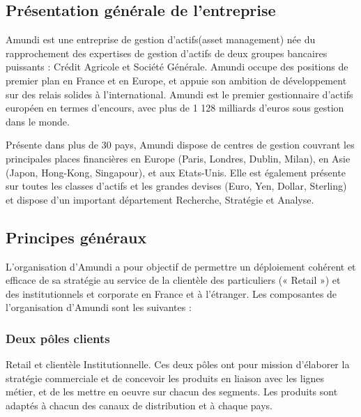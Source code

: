 \documentclass[12pt,a4paper]{report}
\begin{document}
\subsection{Présentation générale de l'entreprise}
Amundi est une entreprise de gestion d'actifs(asset management) née du rapprochement des expertises de gestion d'actifs de deux groupes bancaires puissants : Crédit Agricole et Société Générale. Amundi occupe des positions de premier plan en France et en Europe, et appuie son ambition de développement sur des relais solides à l'international.
Amundi est le premier gestionnaire d’actifs européen en termes d’encours, avec plus de 1 128 milliards d’euros sous gestion dans le monde.\vspace{0.6cm}

Présente dans plus de 30 pays, Amundi dispose de centres de gestion couvrant les principales places financières en Europe (Paris, Londres, Dublin, Milan), en Asie (Japon, Hong-Kong, Singapour), et aux Etats-Unis. Elle est également présente sur toutes les classes d’actifs et les grandes devises (Euro, Yen, Dollar, Sterling) et dispose d’un important département Recherche, Stratégie et Analyse.
\subsection{Principes généraux}
L’organisation d’Amundi a pour objectif de permettre un déploiement cohérent et efficace de sa stratégie au service de la clientèle des particuliers (« Retail ») et des institutionnels et corporate en France et à l’étranger.
\newline
Les composantes de l’organisation d’Amundi sont les suivantes :
\subsubsection{Deux pôles clients}
Retail et clientèle Institutionnelle. Ces deux pôles ont pour mission d’élaborer la stratégie commerciale et de concevoir les produits en liaison avec les lignes métier, et de les mettre en oeuvre sur chacun des segments. Les produits sont adaptés à chacun des canaux de distribution et à chaque pays.
\end{document}
